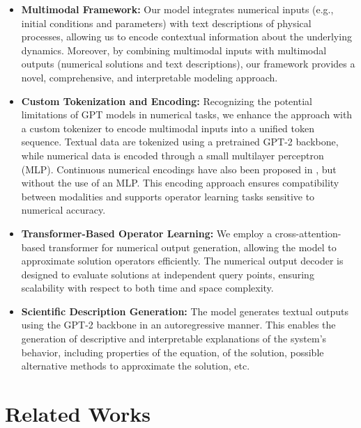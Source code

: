 \documentclass{article}
\begin{document}
\begin{itemize}
    \item \textbf{Multimodal Framework:} Our model integrates numerical inputs (e.g., initial conditions and parameters) with text descriptions of physical processes, allowing us to encode contextual information about the underlying dynamics. Moreover, by combining multimodal inputs with multimodal outputs (numerical solutions and text descriptions), our framework provides a novel, comprehensive, and interpretable modeling approach. 

    \item \textbf{Custom Tokenization and Encoding:} Recognizing the potential limitations of GPT models in numerical tasks, we enhance the approach with a custom tokenizer to encode multimodal inputs into a unified token sequence. Textual data are tokenized using a pretrained GPT-2 backbone, while numerical data is encoded through a small multilayer perceptron (MLP). Continuous numerical encodings have also been proposed in \cite{golkar2023xval}, but without the use of an MLP. This encoding approach ensures compatibility between modalities and supports operator learning tasks sensitive to numerical accuracy.

    \item \textbf{Transformer-Based Operator Learning:} We employ a cross-attention-based transformer for numerical output generation, allowing the model to approximate solution operators efficiently. The numerical output decoder is designed to evaluate solutions at independent query points, ensuring scalability with respect to both time and space complexity.

    \item \textbf{Scientific Description Generation:} The model generates textual outputs using the GPT-2 backbone in an autoregressive manner. This enables the generation of descriptive and interpretable explanations of the system's behavior, including properties of the equation, of the solution, possible alternative methods to approximate the solution, etc.

\end{itemize}


\section{Related Works}
\end{document}
